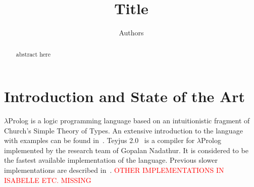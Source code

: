 \documentclass{llncs}
\begin{document}
\title{Title }





\author{Authors}






\newcommand{\frag}{Reduction Free Fragment}
\newcommand{\lp}{$\lambda$Prolog}
\newcommand{\CSC}[1]{\textcolor{red}{#1}}

\maketitle

\begin{abstract}
abstract here
\end{abstract}


\section{Introduction and State of the Art}
\lp{} is a logic programming language based on an intuitionistic fragment
of Church's Simple Theory of Types. An extensive introduction to the language
with examples can be found in~\cite{dalebook}. Teyjus 2.0~\cite{teyjus} is a compiler for \lp{} implemented by the research team of Gopalan Nadathur. It is considered to be the fastest available implementation of the language. Previous slower implementations are described in~\cite{}. \CSC{OTHER IMPLEMENTATIONS IN ISABELLE ETC. MISSING}
\end{document}
